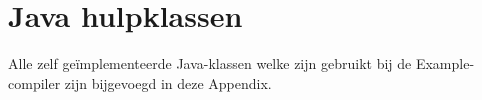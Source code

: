 \chapter{Java hulpklassen}
Alle zelf ge\"{i}mplementeerde Java-klassen welke zijn gebruikt bij de Example-compiler zijn bijgevoegd in deze Appendix.
